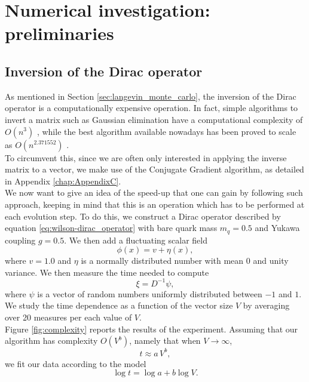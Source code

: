 \chapter{Numerical investigation: preliminaries}
\label{chapt:results_preliminary}
\section{Inversion of the Dirac operator}
\label{sec:inversion_dirac}
As mentioned in Section \ref{sec:langevin_monte_carlo}, the inversion of the Dirac operator is a computationally expensive operation. In fact, simple algorithms to invert a matrix such as Gaussian elimination have a computational complexity of $O(n^3)$ \cite{cond_num_ref}, while the best algorithm available nowadays has been proved to scale as $O(n^{2.371552})$ \cite{williams2023new}. \\
To circumvent this, since we are often only interested in applying the inverse matrix to a vector, we make use of the Conjugate Gradient algorithm, as detailed in Appendix \ref{chap:AppendixC}. \\
We now want to give an idea of the speed-up that one can gain by following such approach, keeping in mind that this is an operation which has to be performed at each evolution step. 
To do this, we construct a Dirac operator described by equation \eqref{eq:wilson-dirac_operator} with bare quark mass $m_q = 0.5$ and Yukawa coupling $g=0.5$. We then add a fluctuating scalar field 
\begin{equation*} 
    \phi(x) = v + \eta(x),
\end{equation*} 
where $v = 1.0$ and $\eta$ is a normally distributed number with mean $0$ and unity variance. We then measure the time needed to compute 
\begin{equation*}
    \xi = D^{-1}\psi,
\end{equation*}
where $\psi$ is a vector of random numbers uniformly distributed between $-1$ and $1$. We study the time dependence as a function of the vector size $V$ by averaging over 20 measures per each value of $V$. \\
Figure \ref{fig:complexity} reports the results of the experiment. Assuming that our algorithm has complexity $O(V^b)$, namely that when $V \to \infty$,
\begin{equation*}
    t \approx a \, V^b,
\end{equation*}
we fit our data according to the model 
\begin{equation*}
    \log t = \log a + b \log V.
\end{equation*}
